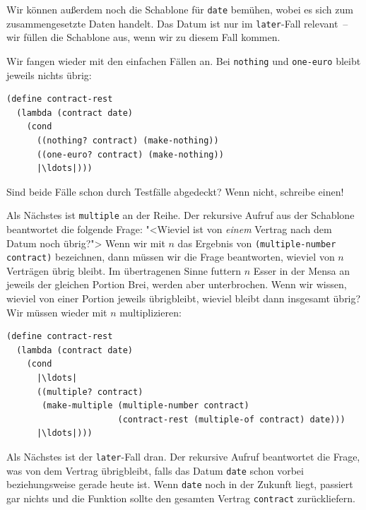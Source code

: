 %
Wir können außerdem noch die Schablone für \lstinline{date} bemühen,
wobei es sich zum zusammengesetzte Daten handelt.  Das Datum ist nur
im \lstinline{later}-Fall relevant~-- wir füllen die Schablone aus,
wenn wir zu diesem Fall kommen.

Wir fangen wieder mit den einfachen Fällen an.  Bei
\lstinline{nothing} und \lstinline{one-euro} bleibt jeweils nichts
übrig:
%
\begin{lstlisting}
(define contract-rest
  (lambda (contract date)
    (cond
      ((nothing? contract) (make-nothing))
      ((one-euro? contract) (make-nothing))
      |\ldots|)))
\end{lstlisting}
%
\begin{aufgabeinline}
  Sind beide Fälle schon durch Testfälle abgedeckt?  Wenn nicht,
  schreibe einen!
\end{aufgabeinline}
%
Als Nächstes ist \lstinline{multiple} an der Reihe.  Der rekursive
Aufruf aus der Schablone beantwortet die folgende Frage: "<Wieviel ist
von \emph{einem} Vertrag nach dem Datum noch übrig?"> Wenn wir mit $n$
das Ergebnis von \lstinline{(multiple-number contract)} bezeichnen,
dann müssen wir die Frage beantworten, wieviel von $n$
Verträgen übrig bleibt.  Im übertragenen Sinne futtern $n$ Esser in
der Mensa an jeweils der gleichen Portion Brei, werden aber
unterbrochen. Wenn wir wissen, wieviel von einer Portion jeweils übrigbleibt,
wieviel bleibt dann insgesamt übrig?  Wir müssen wieder mit $n$
multiplizieren:
%
\begin{lstlisting}
(define contract-rest
  (lambda (contract date)
    (cond
      |\ldots|
      ((multiple? contract)
       (make-multiple (multiple-number contract)
                      (contract-rest (multiple-of contract) date)))
      |\ldots|)))
\end{lstlisting}
%
Als Nächstes ist der \lstinline{later}-Fall dran.  Der rekursive
Aufruf beantwortet die Frage, was von dem Vertrag übrigbleibt, falls
das Datum \lstinline{date} schon vorbei beziehungsweise gerade heute
ist.  Wenn \lstinline{date} noch in der Zukunft liegt, passiert gar
nichts und die Funktion sollte den gesamten Vertrag
\lstinline{contract} zurückliefern.

